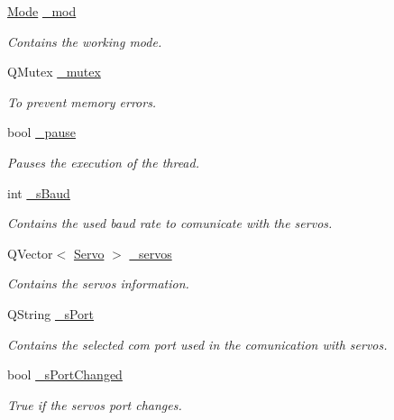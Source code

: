 \begin{DoxyCompactItemize}
\hyperlink{class_servo_thread_a8d581034e60792a9995d44065f6140a5}{Mode} \hyperlink{class_servo_thread_acdecea1688594d3ab7386a6db97dd90d}{\+\_\+mod}
\begin{DoxyCompactList}\small\item\em Contains the working mode. \end{DoxyCompactList}\item 
Q\+Mutex \hyperlink{class_servo_thread_a6327eafc0dac189ec1b202d63ef32457}{\+\_\+mutex}
\begin{DoxyCompactList}\small\item\em To prevent memory errors. \end{DoxyCompactList}\item 
bool \hyperlink{class_servo_thread_aaf2ef80e8e43518b75d20a5102970d2e}{\+\_\+pause}
\begin{DoxyCompactList}\small\item\em Pauses the execution of the thread. \end{DoxyCompactList}\item 
int \hyperlink{class_servo_thread_a5b9a41b9e271275b914affb0a845a2ee}{\+\_\+s\+Baud}
\begin{DoxyCompactList}\small\item\em Contains the used baud rate to comunicate with the servos. \end{DoxyCompactList}\item 
Q\+Vector$<$ \hyperlink{struct_servo_thread_1_1_servo}{Servo} $>$ \hyperlink{class_servo_thread_a1ac6662fe6d198b5971ae0ffa7ddfcfd}{\+\_\+servos}
\begin{DoxyCompactList}\small\item\em Contains the servos information. \end{DoxyCompactList}\item 
Q\+String \hyperlink{class_servo_thread_ac9a614aa1518efb49b0a06636bd1bdbf}{\+\_\+s\+Port}
\begin{DoxyCompactList}\small\item\em Contains the selected com port used in the comunication with servos. \end{DoxyCompactList}\item 
bool \hyperlink{class_servo_thread_a6e803432db01b10ed975132315280fd3}{\+\_\+s\+Port\+Changed}
\begin{DoxyCompactList}\small\item\em True if the servos port changes. \end{DoxyCompactList}\end{DoxyCompactItemize}


